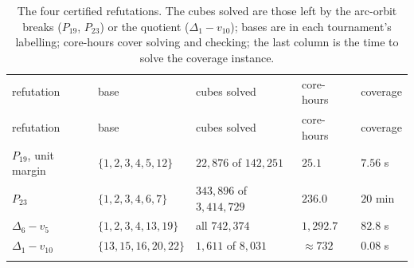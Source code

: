 \documentclass[
]{article}
\begin{document}
\begin{longtable}[]{@{}
  >{\raggedright\arraybackslash}p{}
  >{\raggedright\arraybackslash}p{}
  >{\raggedright\arraybackslash}p{}
  >{\raggedleft\arraybackslash}p{}
  >{\raggedleft\arraybackslash}p{}@{}}
\caption{The four certified refutations. The cubes solved are those left
by the arc-orbit breaks (\(P_{19}\), \(P_{23}\)) or the quotient
(\(\Delta_1 - v_{10}\)); bases are in each tournament's labelling;
core-hours cover solving and checking; the last column is the time to
solve the coverage instance.}\tabularnewline*
\toprule\noalign{}
\begin{minipage}[b]{\linewidth}\raggedright
refutation
\end{minipage} & \begin{minipage}[b]{\linewidth}\raggedright
base
\end{minipage} & \begin{minipage}[b]{\linewidth}\raggedright
cubes solved
\end{minipage} & \begin{minipage}[b]{\linewidth}\raggedleft
core-hours
\end{minipage} & \begin{minipage}[b]{\linewidth}\raggedleft
coverage
\end{minipage} \\*
\midrule\noalign{}
\endfirsthead
\toprule\noalign{}
\begin{minipage}[b]{\linewidth}\raggedright
refutation
\end{minipage} & \begin{minipage}[b]{\linewidth}\raggedright
base
\end{minipage} & \begin{minipage}[b]{\linewidth}\raggedright
cubes solved
\end{minipage} & \begin{minipage}[b]{\linewidth}\raggedleft
core-hours
\end{minipage} & \begin{minipage}[b]{\linewidth}\raggedleft
coverage
\end{minipage} \\*
\midrule\noalign{}
\endhead
\bottomrule\noalign{}
\endlastfoot
\(P_{19}\), unit margin & \(\{1,2,3,4,5,12\}\) & \(22{,}876\) of
\(142{,}251\) & \(25.1\) & \(7.56\) s \\*
\(P_{23}\) & \(\{1,2,3,4,6,7\}\) & \(343{,}896\) of \(3{,}414{,}729\) &
\(236.0\) & \(20\) min \\*
\(\Delta_6 - v_{5}\) & \(\{1,2,3,4,13,19\}\) & all \(742{,}374\) &
\(1{,}292.7\) & \(82.8\) s \\*
\(\Delta_1 - v_{10}\) & \(\{13,15,16,20,22\}\) & \(1{,}611\) of
\(8{,}031\) & \(\approx 732\) & \(0.08\) s \\*
\end{longtable}
\end{document}
